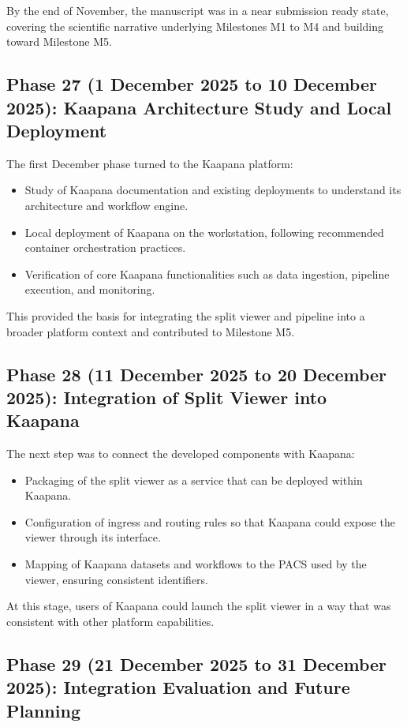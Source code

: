\documentclass[11pt,a4paper]{article}
\begin{document}
By the end of November, the manuscript was in a near submission ready state, covering the scientific narrative underlying Milestones M1 to M4 and building toward Milestone M5.

\subsection*{Phase 27 (1 December 2025 to 10 December 2025): Kaapana Architecture Study and Local Deployment}

The first December phase turned to the Kaapana platform:

\begin{itemize}
    \item Study of Kaapana documentation and existing deployments to understand its architecture and workflow engine.
    \item Local deployment of Kaapana on the workstation, following recommended container orchestration practices.
    \item Verification of core Kaapana functionalities such as data ingestion, pipeline execution, and monitoring.
\end{itemize}

This provided the basis for integrating the split viewer and pipeline into a broader platform context and contributed to Milestone M5.

\subsection*{Phase 28 (11 December 2025 to 20 December 2025): Integration of Split Viewer into Kaapana}

The next step was to connect the developed components with Kaapana:

\begin{itemize}
    \item Packaging of the split viewer as a service that can be deployed within Kaapana.
    \item Configuration of ingress and routing rules so that Kaapana could expose the viewer through its interface.
    \item Mapping of Kaapana datasets and workflows to the PACS used by the viewer, ensuring consistent identifiers.
\end{itemize}

At this stage, users of Kaapana could launch the split viewer in a way that was consistent with other platform capabilities.

\subsection*{Phase 29 (21 December 2025 to 31 December 2025): Integration Evaluation and Future Planning}
\end{document}
